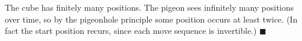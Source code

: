 The cube has finitely many positions. The pigeon sees infinitely many positions over time, so by the pigeonhole principle some position occurs at least twice. (In fact the start position recurs, since each move sequence is invertible.) $\blacksquare$

